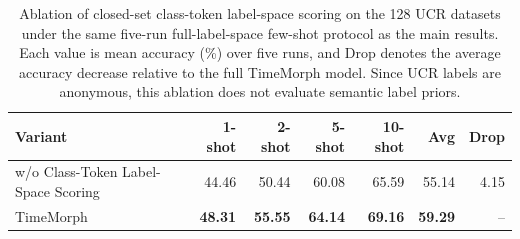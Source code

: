 \begin{table}[t]
\centering
\caption{Ablation of closed-set class-token label-space scoring on the 128 UCR datasets under the same five-run full-label-space few-shot protocol as the main results. Each value is mean accuracy (\%) over five runs, and Drop denotes the average accuracy decrease relative to the full TimeMorph model. Since UCR labels are anonymous, this ablation does not evaluate semantic label priors.}
\label{tab:ablation-decoding}
\begin{tabular}{lrrrrrr}
\toprule
Variant & 1-shot & 2-shot & 5-shot & 10-shot & Avg & Drop \\
\midrule
w/o Class-Token Label-Space Scoring & 44.46 & 50.44 & 60.08 & 65.59 & 55.14 & 4.15 \\
TimeMorph & \textbf{48.31} & \textbf{55.55} & \textbf{64.14} & \textbf{69.16} & \textbf{59.29} & -- \\
\bottomrule
\end{tabular}
\end{table}
